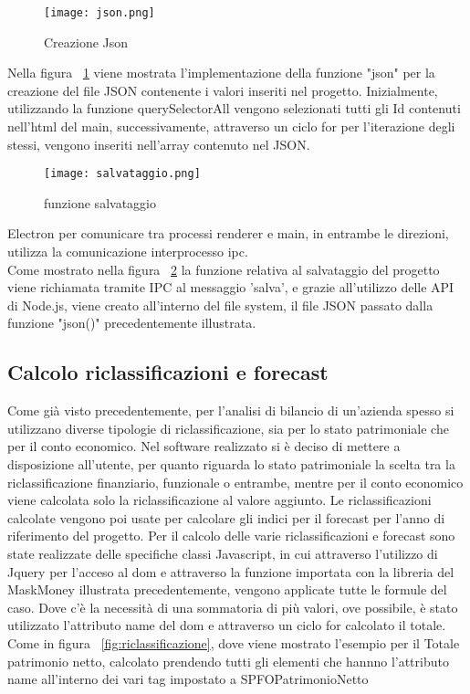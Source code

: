 \begin{figure}[H]
    \centering
    \texttt{[image: json.png]}
    \caption{Creazione Json}
    \label{fig:json}
\end{figure}

Nella figura ~\ref{fig:json} viene mostrata l'implementazione della funzione "json" per la creazione del file JSON contenente i valori inseriti nel progetto. Inizialmente, utilizzando la funzione querySelectorAll vengono selezionati tutti gli Id contenuti nell'html del main, successivamente, attraverso un ciclo for per l'iterazione degli stessi, vengono inseriti nell'array contenuto nel JSON.

\begin{figure}[H]
    \centering
    \texttt{[image: salvataggio.png]}
    \caption{funzione salvataggio}
    \label{fig:salvataggio}
\end{figure}

Electron per comunicare tra processi renderer e main, in entrambe le direzioni, utilizza la comunicazione interprocesso \Gls{ipc}.\\  Come mostrato nella figura ~\ref{fig:salvataggio} la funzione relativa al salvataggio del progetto viene richiamata tramite IPC al messaggio 'salva', e grazie all'utilizzo delle API di Node.js, viene creato all'interno del file system, il file JSON passato dalla funzione "json()" precedentemente illustrata.



\newpage

\subsection {Calcolo riclassificazioni e forecast}

Come già visto precedentemente, per l'analisi di bilancio di un'azienda spesso si utilizzano diverse tipologie di riclassificazione, sia per lo stato patrimoniale che per il conto economico. Nel software realizzato si è deciso di mettere a disposizione all'utente, per quanto riguarda lo stato patrimoniale la scelta tra la riclassificazione finanziario, funzionale o entrambe, mentre per il conto economico viene calcolata solo la riclassificazione al valore aggiunto.
Le riclassificazioni calcolate vengono poi usate per calcolare gli indici per il forecast per l'anno di riferimento del progetto.
Per il calcolo delle varie riclassificazioni e forecast sono state realizzate delle specifiche classi Javascript, in cui attraverso l'utilizzo di Jquery per l'acceso al \Gls{dom} e attraverso la funzione importata con la libreria del MaskMoney illustrata precedentemente, vengono applicate tutte le formule del caso.
Dove c'è la necessità di una sommatoria di più valori, ove possibile, è stato utilizzato l'attributo name del \Gls{dom} e attraverso un ciclo for calcolato il totale. Come in figura ~\ref{fig:riclassificazione}, dove viene mostrato l'esempio per il Totale patrimonio netto, calcolato prendendo tutti gli elementi che hannno l'attributo name all'interno dei vari tag impostato a SPFOPatrimonioNetto \\


